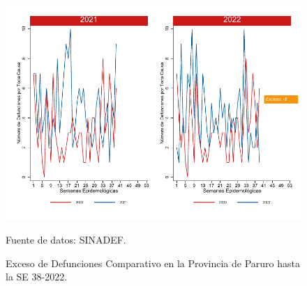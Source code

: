 \documentclass[12pt,a4paper,openany]{book}
\begin{document}
	\begin{figure}[h]
		\caption{Exceso de Defunciones Comparativo en la Provincia de Paruro hasta la SE 38-2022.}\label{fig:exceso_paruro}
		\begin{center}
			\includegraphics[width=0.7\linewidth]{../figuras/exceso_10.pdf}
		\end{center}
		{\footnotesize {Fuente de datos: SINADEF.}}
	\end{figure}
	
	
	\clearpage
	
\end{document}
